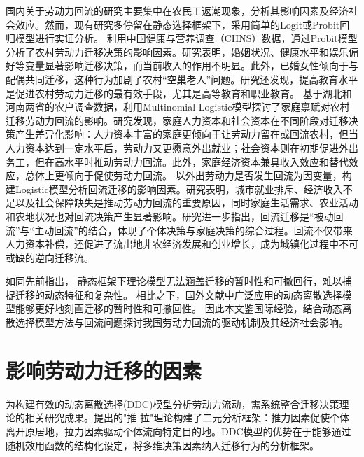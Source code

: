 \documentclass[
  a4paper,
  zihao=-4,
  fontset=mac,
  AutoFakeBold,
  AutoFakeSlant,
  oneside]{ctexbook}
\begin{document}
国内关于劳动力回流的研究主要集中在农民工返潮现象，分析其影响因素及经济社会效应。然而，现有研究多停留在静态选择框架下，采用简单的Logit或Probit回归模型进行实证分析。
\textcite{WangZhiQiangZhongGuoNongCunLaoDongLiQianYiYingXiangYinSuYanJiuJiYuProbitMoXingDeShiZhengFenXi2011}利用中国健康与营养调查（CHNS）数据，通过Probit模型分析了农村劳动力迁移决策的影响因素。研究表明，婚姻状况、健康水平和娱乐偏好等变量显著影响迁移决策，而当前收入的作用不明显。此外，已婚女性倾向于与配偶共同迁移，这种行为加剧了农村“空巢老人”问题。研究还发现，提高教育水平是促进农村劳动力迁移的最有效手段，尤其是高等教育和职业教育。
\textcite{ShiZhiLeiJiaTingBingFuJiaTingJueCeYuNongCunQianYiLaoDongLiHuiLiu2012}基于湖北和河南两省的农户调查数据，利用Multinomial Logistic模型探讨了家庭禀赋对农村迁移劳动力回流的影响。研究发现，家庭人力资本和社会资本在不同阶段对迁移决策产生差异化影响：人力资本丰富的家庭更倾向于让劳动力留在或回流农村，但当人力资本达到一定水平后，劳动力又更愿意外出就业；社会资本则在初期促进外出务工，但在高水平时推动劳动力回流。此外，家庭经济资本兼具收入效应和替代效应，总体上更倾向于促使劳动力回流。
\textcite{RenYuanNongCunWaiChuLaoDongLiHuiLiuQianYiDeYingXiangYinSuHeHuiLiuXiaoYing2017}以外出劳动力是否发生回流为因变量，构建Logistic模型分析回流迁移的影响因素。研究表明，城市就业排斥、经济收入不足以及社会保障缺失是推动劳动力回流的重要原因，同时家庭生活需求、农业活动和农地状况也对回流决策产生显著影响。研究进一步指出，回流迁移是“被动回流”与“主动回流”的结合，体现了个体决策与家庭决策的综合过程。回流不仅带来人力资本补偿，还促进了流出地非农经济发展和创业增长，成为城镇化过程中不可或缺的逆向迁移流。


如同先前指出，
静态框架下理论模型无法涵盖迁移的暂时性和可撤回行，难以捕捉迁移的动态特征和复杂性。
相比之下，国外文献中广泛应用的动态离散选择模型能够更好地刻画迁移的暂时性和可撤回性。
因此本文鉴国际经验，结合动态离散选择模型方法与回流问题探讨我国劳动力回流的驱动机制及其经济社会影响。


\section{影响劳动力迁移的因素}
\label{sec:_影响劳动力迁移的因素}

为构建有效的动态离散选择(DDC)模型分析劳动力流动，需系统整合迁移决策理论的相关研究成果。\textcite{leeTheoryMigration1966}提出的"推-拉"理论构建了二元分析框架：推力因素促使个体离开原居地，拉力因素驱动个体流向特定目的地。DDC模型的优势在于能够通过随机效用函数的结构化设定，将多维决策因素纳入迁移行为的分析框架。
\end{document}
